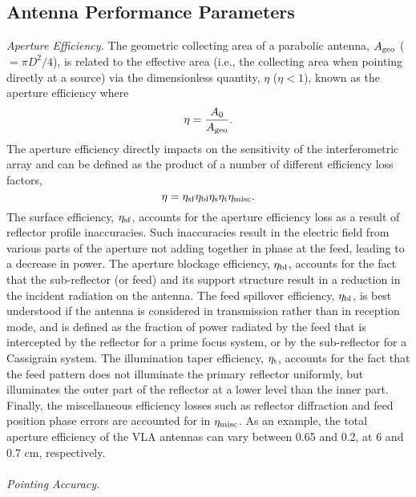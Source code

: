 \subsection{Antenna Performance Parameters}\label{subsec:2.1.3}
\textit{Aperture Efficiency.} The geometric collecting area of a parabolic antenna, $A_{\rm{geo}}$ ($=\pi D^2/4$), is related to the effective area (i.e., the collecting area when pointing directly at a source) via the dimensionless quantity, $\eta$ ($\eta < 1$), known as the aperture efficiency where
\begin{equation}
\eta = \frac{A_0}{A_{\rm{geo}}}.
\end{equation}
The aperture efficiency directly impacts on the sensitivity of the interferometric array and can be defined as the product of a number of different efficiency loss factors, 
\begin{equation}
\eta = \eta _{\rm{sf}}\eta _{\rm{bl}}\eta _{\rm{s}}\eta _{\rm{t}}\eta _{\rm{misc}}.
\end{equation}
The surface efficiency, $\eta _{\rm{sf}}$, accounts for the aperture efficiency loss as a result of reflector profile inaccuracies. Such inaccuracies result in the electric field from various parts of the aperture not adding together in phase at the feed, leading to a decrease in power. The aperture blockage efficiency, $\eta _{\rm{bl}}$, accounts for the fact that the sub-reflector (or feed) and its support structure result in a reduction in the incident radiation on the antenna. The feed spillover efficiency, $\eta _{\rm{bl}}$, is best understood if the antenna is considered in transmission rather than in reception mode, and  is defined as the fraction of power radiated by the feed that is intercepted by the reflector for a prime focus system, or by the sub-reflector for a Cassigrain system. The illumination taper efficiency, $\eta _{\rm{t}}$, accounts for the fact that the feed pattern does not illuminate the primary reflector uniformly, but illuminates the outer part of the reflector at a lower level than the inner part. Finally, the miscellaneous efficiency losses such as reflector diffraction and feed position phase errors are accounted for in $\eta _{\rm{misc}}$. As an example, the total aperture efficiency of the VLA antennas can vary between 0.65 and 0.2, at 6 and 0.7 cm, respectively.
\\
\\
\textit{Pointing Accuracy.}
